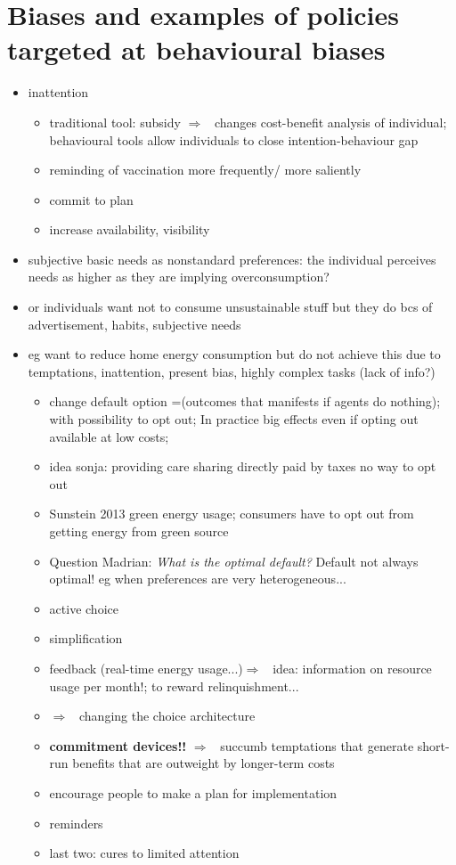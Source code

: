 \documentclass[12pt]{article}
\newcommand{\ar}{$\Rightarrow$ \ }
\begin{document}
\section{Biases and examples of policies targeted at behavioural biases}
\begin{itemize}
	\item inattention
	\begin{itemize}
\item traditional tool: subsidy \ar changes cost-benefit analysis of individual; behavioural tools allow individuals to close intention-behaviour gap
\item reminding of vaccination  more frequently/ more saliently
\item commit to plan
\item increase availability, visibility
	\end{itemize}
\item subjective basic needs as nonstandard preferences: the individual perceives needs as higher as they are implying overconsumption? 
\item or individuals want not to consume unsustainable stuff but they do bcs of advertisement, habits, subjective needs 
\item eg want to reduce home energy consumption but do not achieve this due to temptations, inattention, present bias, highly complex tasks (lack of info?)
\begin{itemize}
\item change default option =(outcomes that manifests if agents do nothing); with possibility to opt out; In practice big effects even if opting out available at low costs; 
\item idea sonja: providing care sharing directly paid by taxes no way to opt out
\item Sunstein 2013 green energy usage; consumers have to opt out from getting energy from green source 
\item  Question Madrian: \textit{What is the optimal default?} Default not always optimal! eg when preferences are very heterogeneous...
\item active choice
\item simplification 
\item feedback (real-time energy usage...)\ar idea: information on resource usage per month!; to reward relinquishment...
\item \ar changing the choice architecture
\item \textbf{commitment devices!! }\ar succumb temptations that generate short-run benefits that are outweight by longer-term costs
\item encourage people to make a plan for implementation 
\item reminders
\item last two: cures to limited attention
\end{itemize}
\end{itemize}
\clearpage

\end{document}
